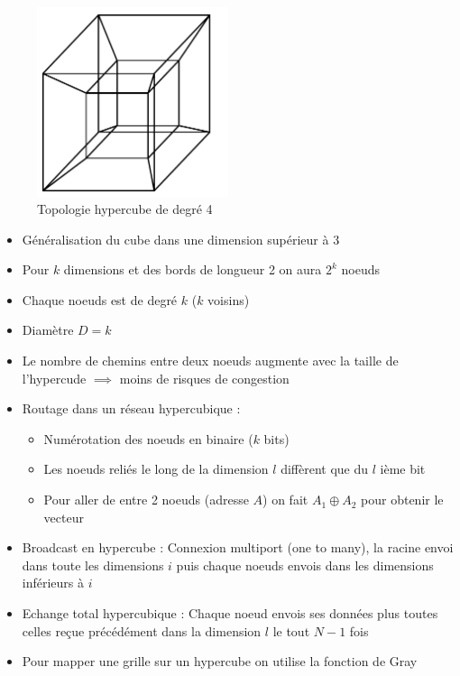 \documentclass[12pt,a4paper,oneside, titlepage]{article}
\begin{document}
      \begin{figure}[H]
        \centering
        \includegraphics[width=0.5\textwidth]{images/hyp}
        \caption{Topologie hypercube de degré 4}
      \end{figure}

      \begin{itemize}
        \item Généralisation du cube dans une dimension supérieur à 3
        \item Pour $k$ dimensions et des bords de longueur 2 on aura $2^k$ noeuds
        \item Chaque noeuds est de degré $k$ ($k$ voisins)
        \item Diamètre $D = k$
        \item Le nombre de chemins entre deux noeuds augmente avec la taille de l'hypercude $\implies$ moins de risques de congestion
        \item Routage dans un réseau hypercubique :
        \begin{itemize}
          \item Numérotation des noeuds en binaire ($k$ bits)
          \item Les noeuds reliés le long de la dimension $l$ diffèrent que du $l$ ième bit
          \item Pour aller de entre 2 noeuds (adresse $A$) on fait $A_1 \oplus A_2$ pour obtenir le vecteur
        \end{itemize}
        \item Broadcast en hypercube : Connexion multiport (one to many), la racine envoi dans toute les dimensions $i$ puis chaque noeuds envois dans les dimensions inférieurs à $i$
        \item Echange total hypercubique : Chaque noeud envois ses données plus toutes celles reçue précédément dans la dimension $l$ le tout $N-1$ fois
        \item Pour mapper une grille sur un hypercube on utilise la fonction de Gray
      \end{itemize}
\end{document}
